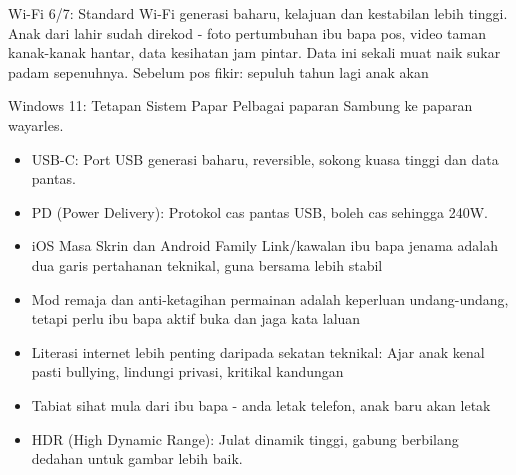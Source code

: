 \begin{tcbwarn}{Wi-Fi 6/7: Standard Wi-Fi generasi baharu, kelajuan dan kestabilan lebih tinggi.}
Anak dari lahir sudah direkod - foto pertumbuhan ibu bapa pos, video taman kanak-kanak hantar, data kesihatan jam pintar. Data ini sekali muat naik sukar padam sepenuhnya. Sebelum pos fikir: sepuluh tahun lagi anak akan

\end{tcbwarn}

\begin{tcbsummary}{Windows 11: Tetapan Sistem Papar Pelbagai paparan Sambung ke paparan wayarles.}
\begin{itemize}
  \item USB-C: Port USB generasi baharu, reversible, sokong kuasa tinggi dan data pantas.
  \item PD (Power Delivery): Protokol cas pantas USB, boleh cas sehingga 240W.
  \item iOS Masa Skrin dan Android Family Link/kawalan ibu bapa jenama adalah dua garis pertahanan teknikal, guna bersama lebih stabil
  \item Mod remaja dan anti-ketagihan permainan adalah keperluan undang-undang, tetapi perlu ibu bapa aktif buka dan jaga kata laluan
  \item Literasi internet lebih penting daripada sekatan teknikal: Ajar anak kenal pasti bullying, lindungi privasi, kritikal kandungan
  \item Tabiat sihat mula dari ibu bapa - anda letak telefon, anak baru akan letak
  \item HDR (High Dynamic Range): Julat dinamik tinggi, gabung berbilang dedahan untuk gambar lebih baik.
\end{itemize}

\end{tcbsummary}
